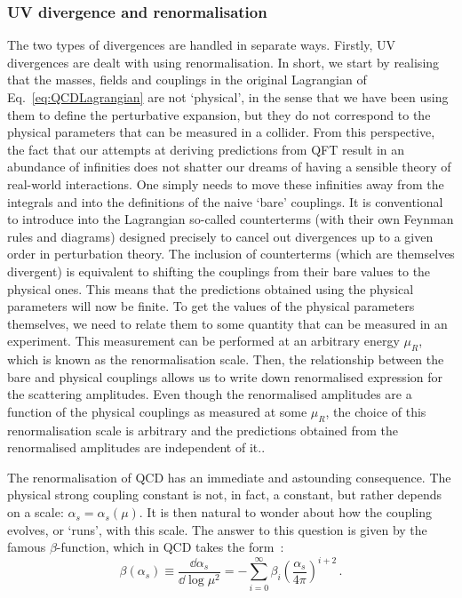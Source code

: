 \documentclass[main.tex]{subfiles}
\begin{document}
\subsubsection{UV divergence and renormalisation}
The two types of divergences are handled in separate ways. Firstly, UV divergences are dealt with using renormalisation. In short, we start by realising that the masses, fields and couplings in the original Lagrangian of Eq.~\ref{eq:QCDLagrangian} are not `physical', in the sense that we have been using them to define the perturbative expansion, but they do not correspond to the physical parameters that can be measured in a collider. From this perspective, the fact that our attempts at deriving predictions from QFT result in an abundance of infinities does not shatter our dreams of having a sensible theory of real-world interactions. One simply needs to move these infinities away from the integrals and into the definitions of the naive `bare' couplings. It is conventional to introduce into the Lagrangian so-called counterterms (with their own Feynman rules and diagrams) designed precisely to cancel out divergences up to a given order in perturbation theory. The inclusion of counterterms (which are themselves divergent) is equivalent to shifting the couplings from their bare values to the physical ones. This means that the predictions obtained using the physical parameters will now be finite. To get the values of the physical parameters themselves, we need to relate them to some quantity that can be measured in an experiment. This measurement can be performed at an arbitrary energy $\mu_R$, which is known as the renormalisation scale. Then, the relationship between the bare and physical couplings allows us to write down renormalised expression for the scattering amplitudes. Even though the renormalised amplitudes are a function of the physical couplings as measured at some $\mu_R$, the choice of this renormalisation scale is arbitrary and the predictions obtained from the renormalised amplitudes are independent of it..

The renormalisation of QCD has an immediate and astounding consequence. The physical strong coupling constant is not, in fact, a constant, but rather depends on a scale: $\alpha_s = \alpha_s(\mu)$. 
It is then natural to wonder about how the coupling evolves, or `runs', with this scale. The answer to this question is given by the famous $\beta$-function, which in QCD takes the form~\cite{PhysRevD.2.1541, Symanzik:1970rt}:
\begin{equation} \label{eq:QCDbetafunction}
    \beta(\alpha_s) \equiv \frac{\dd \alpha_s}{\dd \log \mu^2} = - \sum_{i=0}^\infty \beta_i \left (\frac{\alpha_s}{4\pi} \right)^{i+2}\,.
\end{equation}
\end{document}
